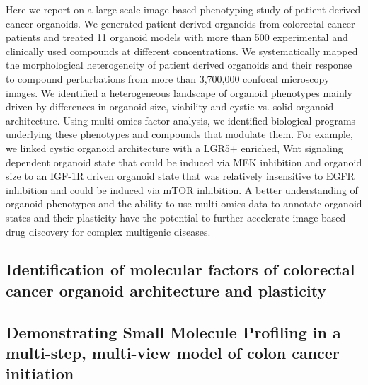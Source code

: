 \begin{flushleft}
Here we report on a large-scale image based phenotyping study of patient derived cancer organoids. We generated patient derived organoids from colorectal cancer patients and treated 11 organoid models with more than 500 experimental and clinically used compounds at different concentrations. We systematically mapped the morphological heterogeneity of patient derived organoids and their response to compound perturbations from more  than  3,700,000  confocal microscopy images. We identified a heterogeneous landscape of organoid phenotypes mainly driven by differences in organoid size, viability and cystic vs. solid organoid architecture. Using multi-omics factor analysis, we identified biological programs underlying these phenotypes and compounds that modulate them. For example, we linked cystic organoid architecture with a LGR5+ enriched, Wnt signaling dependent organoid state that could be induced via MEK inhibition and organoid size to an IGF-1R driven organoid state that was relatively insensitive to EGFR inhibition and could be induced via mTOR inhibition. A better understanding of organoid phenotypes and the ability to use multi-omics data to annotate organoid states and their plasticity have the potential to further accelerate image-based drug discovery for complex multigenic diseases.


\subsection{Identification of molecular factors of colorectal cancer organoid architecture and plasticity}

\subsection{Demonstrating Small Molecule Profiling in a multi-step, multi-view model of colon cancer initiation}
\end{flushleft}


